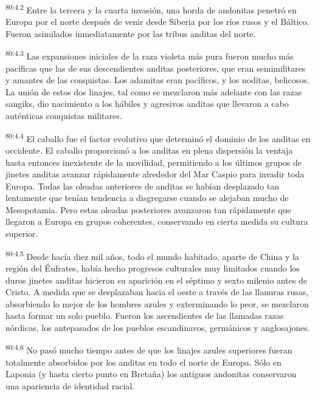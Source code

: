 \par
\textsuperscript{80:4.2} Entre la tercera y la cuarta invasión, una horda de andonitas penetró en Europa por el norte después de venir desde Siberia por los ríos rusos y el Báltico. Fueron asimilados inmediatamente por las tribus anditas del norte.

\par
\textsuperscript{80:4.3} Las expansiones iniciales de la raza violeta más pura fueron mucho más pacíficas que las de sus descendientes anditas posteriores, que eran semimilitares y amantes de las conquistas. Los adamitas eran pacíficos, y los noditas, belicosos. La unión de estos dos linajes, tal como se mezclaron más adelante con las razas sangiks, dio nacimiento a los hábiles y agresivos anditas que llevaron a cabo auténticas conquistas militares.

\par
\textsuperscript{80:4.4} El caballo fue el factor evolutivo que determinó el dominio de los anditas en occidente. El caballo proporcionó a los anditas en plena dispersión la ventaja hasta entonces inexistente de la movilidad, permitiendo a los últimos grupos de jinetes anditas avanzar rápidamente alrededor del Mar Caspio para invadir toda Europa. Todas las oleadas anteriores de anditas se habían desplazado tan lentamente que tenían tendencia a disgregarse cuando se alejaban mucho de Mesopotamia. Pero estas oleadas posteriores avanzaron tan rápidamente que llegaron a Europa en grupos coherentes, conservando en cierta medida su cultura superior.

\par
\textsuperscript{80:4.5} Desde hacía diez mil años, todo el mundo habitado, aparte de China y la región del Éufrates, había hecho progresos culturales muy limitados cuando los duros jinetes anditas hicieron su aparición en el séptimo y sexto milenio antes de Cristo. A medida que se desplazaban hacia el oeste a través de las llanuras rusas, absorbiendo lo mejor de los hombres azules y exterminando lo peor, se mezclaron hasta formar un solo pueblo. Fueron los ascendientes de las llamadas razas nórdicas, los antepasados de los pueblos escandinavos, germánicos y anglosajones.

\par
\textsuperscript{80:4.6} No pasó mucho tiempo antes de que los linajes azules superiores fueran totalmente absorbidos por los anditas en todo el norte de Europa. Sólo en Laponia (y hasta cierto punto en Bretaña) los antiguos andonitas conservaron una apariencia de identidad racial.

